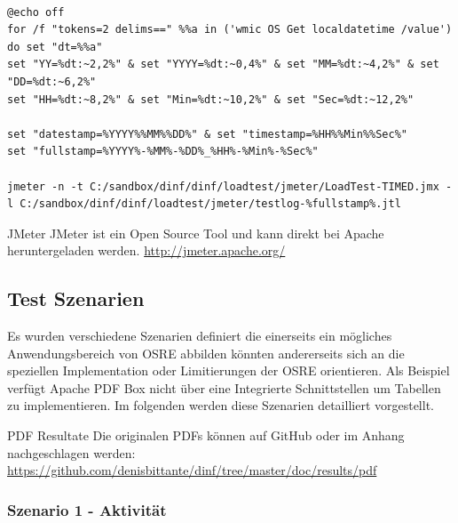 \documentclass[main.tex]{subfiles}
\begin{document}
\begin{lstlisting}[language=command.com]
           
@echo off
for /f "tokens=2 delims==" %%a in ('wmic OS Get localdatetime /value') do set "dt=%%a"
set "YY=%dt:~2,2%" & set "YYYY=%dt:~0,4%" & set "MM=%dt:~4,2%" & set "DD=%dt:~6,2%"
set "HH=%dt:~8,2%" & set "Min=%dt:~10,2%" & set "Sec=%dt:~12,2%"

set "datestamp=%YYYY%%MM%%DD%" & set "timestamp=%HH%%Min%%Sec%"
set "fullstamp=%YYYY%-%MM%-%DD%_%HH%-%Min%-%Sec%"

jmeter -n -t C:/sandbox/dinf/dinf/loadtest/jmeter/LoadTest-TIMED.jmx -l C:/sandbox/dinf/dinf/loadtest/jmeter/testlog-%fullstamp%.jtl

\end{lstlisting}




\begin{reference}{JMeter}
JMeter ist ein Open Source Tool und kann direkt bei Apache heruntergeladen werden.  \newline
\url{http://jmeter.apache.org/}
\end{reference}



\subsection{Test Szenarien}
Es wurden verschiedene Szenarien definiert die einerseits ein mögliches Anwendungsbereich von OSRE abbilden könnten andererseits sich an die speziellen Implementation oder Limitierungen der OSRE orientieren. Als Beispiel verfügt Apache PDF Box nicht über eine Integrierte Schnittstellen um Tabellen zu implementieren. Im folgenden werden diese Szenarien detailliert vorgestellt.  


\begin{reference}{PDF Resultate}
 Die originalen PDFs können auf GitHub oder im Anhang nachgeschlagen werden: \url{https://github.com/denisbittante/dinf/tree/master/doc/results/pdf}
 
\end{reference}

\subsubsection{Szenario 1 - Aktivität}
\end{document}
